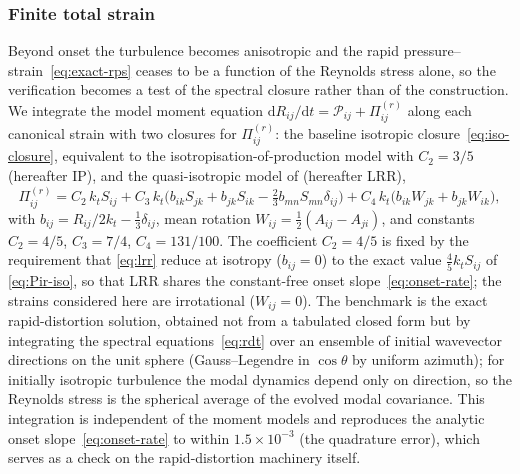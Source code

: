 \documentclass[lineno]{JFM-FLM_Au}
\begin{document}
%
%

\subsubsection{Finite total strain}\label{sec:finite-strain}

Beyond onset the turbulence becomes anisotropic and the rapid
pressure--strain~\eqref{eq:exact-rps} ceases to be a function of the
Reynolds stress alone, so the verification becomes a test of the spectral
closure rather than of the construction. We integrate the model moment
equation $\mathrm{d}R_{ij}/\mathrm{d}t=\mathcal{P}_{ij}+\Pi_{ij}^{(r)}$
along each canonical strain with two closures for $\Pi_{ij}^{(r)}$: the
baseline isotropic closure~\eqref{eq:iso-closure}, equivalent to the
isotropisation-of-production model with $C_2=3/5$ (hereafter IP), and the
quasi-isotropic model of \citet{LaunderReeceRodi1975} (hereafter LRR),
\begin{equation}
  \Pi_{ij}^{(r)} = C_2\,k_t S_{ij}
  + C_3\,k_t\big(b_{ik}S_{jk}+b_{jk}S_{ik}-\tfrac{2}{3}b_{mn}S_{mn}\delta_{ij}\big)
  + C_4\,k_t\big(b_{ik}W_{jk}+b_{jk}W_{ik}\big),
  \label{eq:lrr}
\end{equation}
with $b_{ij}=R_{ij}/2k_t-\tfrac13\delta_{ij}$, mean rotation
$W_{ij}=\tfrac12(A_{ij}-A_{ji})$, and constants $C_2=4/5$, $C_3=7/4$,
$C_4=131/100$. The coefficient $C_2=4/5$ is fixed by the requirement that
\eqref{eq:lrr} reduce at isotropy ($b_{ij}=0$) to the exact value
$\tfrac45 k_t S_{ij}$ of \eqref{eq:Pir-iso}, so that LRR shares the
constant-free onset slope~\eqref{eq:onset-rate}; the strains considered
here are irrotational ($W_{ij}=0$). The benchmark is the exact
rapid-distortion solution, obtained not from a tabulated closed form but by
integrating the spectral equations~\eqref{eq:rdt} over an ensemble of
initial wavevector directions on the unit sphere (Gauss--Legendre in
$\cos\theta$ by uniform azimuth); for initially isotropic turbulence the
modal dynamics depend only on direction, so the Reynolds stress is the
spherical average of the evolved modal covariance. This integration is
independent of the moment models and reproduces the analytic onset
slope~\eqref{eq:onset-rate} to within $1.5\times10^{-3}$ (the quadrature
error), which serves as a check on the rapid-distortion machinery itself.
\end{document}
